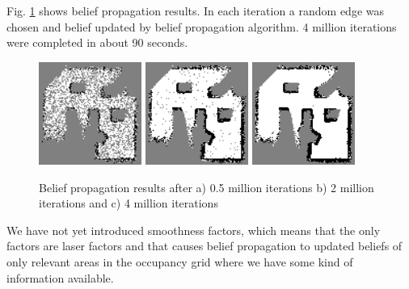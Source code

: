 \documentclass[10pt,oneside,letterpaper]{article}
\begin{document}
Fig. \ref{fig:bpresults} shows belief propagation results. In each iteration a random edge was chosen and belief updated by belief propagation algorithm. 4 million iterations were completed in about 90 seconds.
\begin{figure}
  \includegraphics[width=0.3\textwidth]{bpresults_100x100_50.png}
  \includegraphics[width=0.3\textwidth]{bpresults_100x100_200.png}
  \includegraphics[width=0.3\textwidth]{beliefpropagation_results_100x100.png}
  \caption{Belief propagation results after a) 0.5 million iterations b) 2 million iterations and c) 4 million iterations}
  \label{fig:bpresults}
\end{figure}

We have not yet introduced smoothness factors, which means that the only factors are laser factors and that causes belief propagation to updated beliefs of only relevant areas in the occupancy grid where we have some kind of information available.
\end{document}
